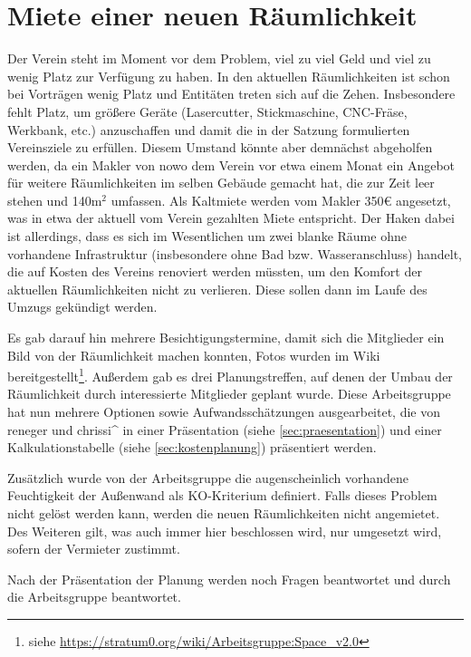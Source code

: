 \documentclass[a4paper,12pt]{scrartcl}
\begin{document}
\section{Miete einer neuen Räumlichkeit}

Der Verein steht im Moment vor dem Problem, viel zu viel Geld und viel zu wenig
Platz zur Verfügung zu haben. In den aktuellen Räumlichkeiten ist schon bei
Vorträgen wenig Platz und Entitäten treten sich auf die Zehen. Insbesondere
fehlt Platz, um größere Geräte (Lasercutter, Stickmaschine, CNC-Fräse, Werkbank,
etc.) anzuschaffen und damit die in der Satzung formulierten Vereinsziele zu
erfüllen. Diesem Umstand könnte aber demnächst abgeholfen werden, da ein Makler
von nowo dem Verein vor etwa einem Monat ein Angebot für weitere Räumlichkeiten
im selben Gebäude gemacht hat, die zur Zeit leer stehen und 140m$^2$ umfassen.
Als Kaltmiete werden vom Makler 350€ angesetzt, was in etwa der aktuell vom
Verein gezahlten Miete entspricht. Der Haken dabei ist allerdings, dass es sich
im Wesentlichen um zwei blanke Räume ohne vorhandene Infrastruktur (insbesondere
ohne Bad bzw.  Wasseranschluss) handelt, die auf Kosten des Vereins renoviert
werden müssten, um den Komfort der aktuellen Räumlichkeiten nicht zu verlieren.
Diese sollen dann im Laufe des Umzugs gekündigt werden.

Es gab darauf hin mehrere Besichtigungstermine, damit sich die Mitglieder ein
Bild von der Räumlichkeit machen konnten, Fotos wurden im Wiki
bereitgestellt\footnote{siehe
\url{https://stratum0.org/wiki/Arbeitsgruppe:Space_v2.0}}. Außerdem gab es
drei Planungstreffen, auf denen der Umbau der Räumlichkeit durch interessierte
Mitglieder geplant wurde. Diese Arbeitsgruppe hat nun mehrere Optionen sowie
Aufwandsschätzungen ausgearbeitet, die von reneger und chrissi\^{} in einer
Präsentation (siehe \ref{sec:praesentation}) und einer Kalkulationstabelle
(siehe \ref{sec:kostenplanung}) präsentiert werden.

Zusätzlich wurde von der Arbeitsgruppe die augenscheinlich vorhandene
Feuchtigkeit der Außenwand als KO-Kriterium definiert. Falls dieses Problem
nicht gelöst werden kann, werden die neuen Räumlichkeiten nicht angemietet. Des
Weiteren gilt, was auch immer hier beschlossen wird, nur umgesetzt wird, sofern
der Vermieter zustimmt.

Nach der Präsentation der Planung werden noch Fragen beantwortet und durch die
Arbeitsgruppe beantwortet.

\end{document}
